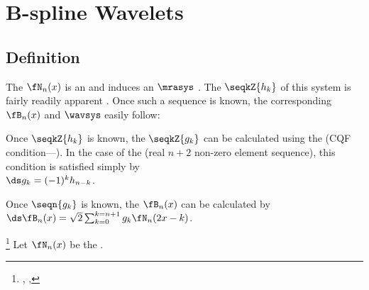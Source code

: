 


\chapter{B-spline Wavelets}
\label{chp:bwav}
\section{Definition}
The  $\fN_n(x)$ is an  and
induces an  $\mrasys$ .
The  $\seqkZ{h_k}$ of this system is fairly readily apparent .
Once such a sequence is known, the corresponding  $\fB_n(x)$  and
 $\wavsys$  easily follow:
\begin{liste}
  \item Once $\seqkZ{h_k}$ is known, the  $\seqkZ{g_k}$ \label{item:bwav_cqf}
        can be calculated using the  (CQF condition---).
        In the case of the  (real $n+2$ non-zero element sequence),
        this condition is satisfied simply by
        \\\indentx$\ds g_k = (-1)^k h_{n-k}$.
  \item Once $\seqn{g_k}$ is known, the  $\fB_n(x)$
        can be calculated by 
        \\\indentx$\ds \fB_n(x) = \sqrt{2}\sum_{k=0}^{k=n+1} g_k \fN_n(2x-k)$.
\end{liste}

\begin{definition}
\footnote{
  ,
  ,
  }
\label{def:Bn}
Let $\fN_n(x)$ be the  .
\end{definition}

